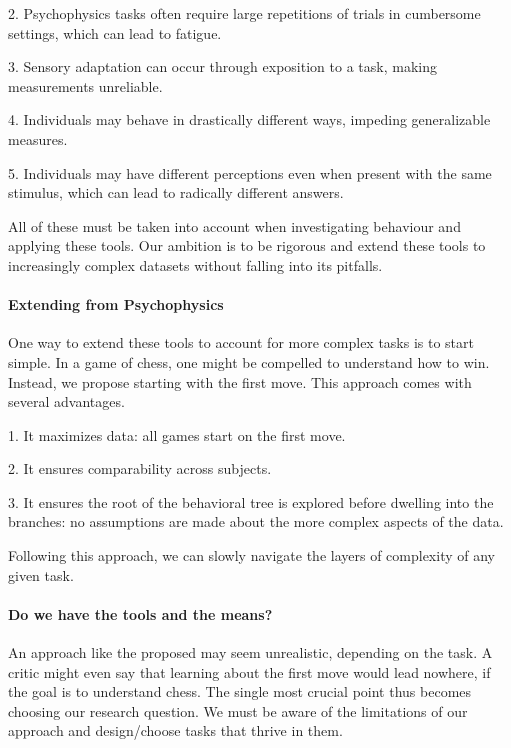 \documentclass[11pt]{article}
\begin{document}
2. Psychophysics tasks often require large repetitions of trials in cumbersome settings, which can lead to fatigue.

3. Sensory adaptation can occur through exposition to a task, making measurements unreliable.

4. Individuals may behave in drastically different ways, impeding generalizable measures.

5. Individuals may have different perceptions even when present with the same stimulus, which can lead to radically different answers.

All of these must be taken into account when investigating behaviour and applying these tools. Our ambition is to be rigorous and extend these tools to increasingly complex datasets without falling into its pitfalls.

\paragraph{Extending from Psychophysics}
One way to extend these tools to account for more complex tasks is to start simple. In a game of chess, one might be compelled to understand how to win. Instead, we propose starting with the first move.
This approach comes with several advantages.

1. It maximizes data: all games start on the first move.

2. It ensures comparability across subjects.

3. It ensures the root of the behavioral tree is explored before dwelling into the branches: no assumptions are made about the more complex aspects of the data.

Following this approach, we can slowly navigate the layers of complexity of any given task.

\paragraph{Do we have the tools and the means?}
An approach like the proposed may seem unrealistic, depending on the task. A critic might even say that learning about the first move would lead nowhere, if the goal is to understand chess.
The single most crucial point thus becomes choosing our research question. We must be aware of the limitations of our approach and design/choose tasks that thrive in them.
\end{document}
